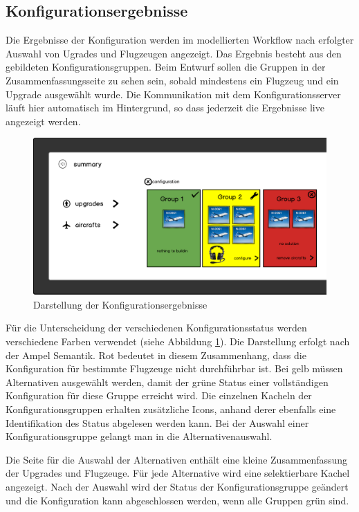 \subsection{Konfigurationsergebnisse}
Die Ergebnisse der Konfiguration werden im modellierten Workflow nach erfolgter Auswahl von Ugrades und Flugzeugen angezeigt. Das Ergebnis besteht aus den gebildeten Konfigurationsgruppen. Beim Entwurf sollen die Gruppen in der Zusammenfassungsseite zu sehen sein, sobald mindestens ein Flugzeug und ein Upgrade ausgewählt wurde. Die Kommunikation mit dem Konfigurationsserver läuft hier automatisch im Hintergrund, so dass jederzeit die Ergebnisse live angezeigt werden. \par
\begin{figure}
\centering
\includegraphics[width=\hsize]{images/configuration_entwurf}
\caption{Darstellung der Konfigurationsergebnisse}
\label{confSketch}
\end{figure}
 Für die Unterscheidung der verschiedenen Konfigurationsstatus werden verschiedene Farben verwendet (siehe Abbildung \ref{confSketch}). Die Darstellung erfolgt nach der Ampel Semantik. Rot bedeutet in diesem Zusammenhang, dass die Konfiguration für bestimmte Flugzeuge nicht durchführbar ist. Bei gelb müssen Alternativen ausgewählt werden, damit der grüne Status einer vollständigen Konfiguration für diese Gruppe erreicht wird. Die einzelnen Kacheln der Konfigurationsgruppen erhalten zusätzliche Icons, anhand derer ebenfalls eine Identifikation des Status abgelesen werden kann. Bei der Auswahl einer Konfigurationsgruppe gelangt man in die Alternativenauswahl. \par
 
 Die Seite für die Auswahl der Alternativen enthält eine kleine Zusammenfassung der Upgrades und Flugzeuge. Für jede Alternative wird eine selektierbare Kachel angezeigt. Nach der Auswahl wird der Status der Konfigurationsgruppe geändert und die Konfiguration kann abgeschlossen werden, wenn alle Gruppen grün sind.

